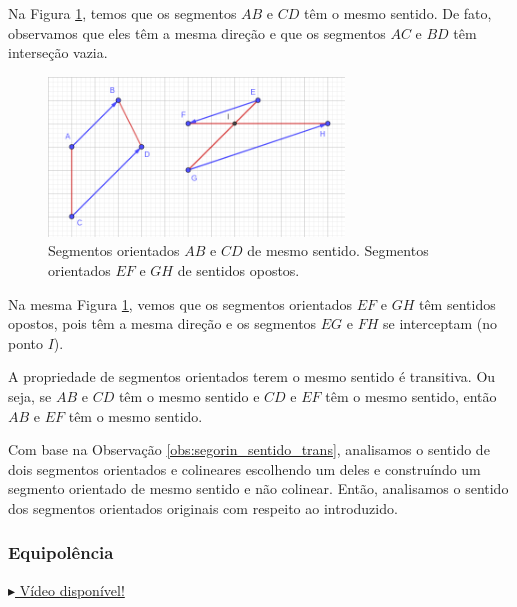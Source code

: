 \begin{ex}
  Na Figura \ref{fig:segorien_sentido}, temos que os segmentos $AB$ e $CD$ têm o mesmo sentido. De fato, observamos que eles têm a mesma direção e que os segmentos $AC$ e $BD$ têm interseção vazia.

\begin{figure}[H]
  \centering
  \includegraphics[width=0.7\textwidth]{./cap_vetor/dados/fig_segorien_sentido/fig_segorien_sentido}
  \caption{Segmentos orientados $AB$ e $CD$ de mesmo sentido. Segmentos orientados $EF$ e $GH$ de sentidos opostos.}
  \label{fig:segorien_sentido}
\end{figure}

Na mesma Figura \ref{fig:segorien_sentido}, vemos que os segmentos orientados $EF$ e $GH$ têm sentidos opostos, pois têm a mesma direção e os segmentos $EG$ e $FH$ se interceptam (no ponto $I$). 
\end{ex}

\begin{obs}\label{obs:segorin_sentido_trans}
  A propriedade de segmentos orientados terem o mesmo sentido é transitiva. Ou seja, se $AB$ e $CD$ têm o mesmo sentido e $CD$ e $EF$ têm o mesmo sentido, então $AB$ e $EF$ têm o mesmo sentido.
\end{obs}

Com base na Observação \ref{obs:segorin_sentido_trans}, analisamos o sentido de dois segmentos orientados e colineares escolhendo um deles e construíndo um segmento orientado de mesmo sentido  e não colinear. Então, analisamos o sentido dos segmentos orientados originais com respeito ao introduzido.

\subsubsection{Equipolência}

\begin{flushright}
  \href{https://archive.org/details/segmentos-orientados-equipolentes}{$\blacktriangleright$ Vídeo disponível!}
\end{flushright}

